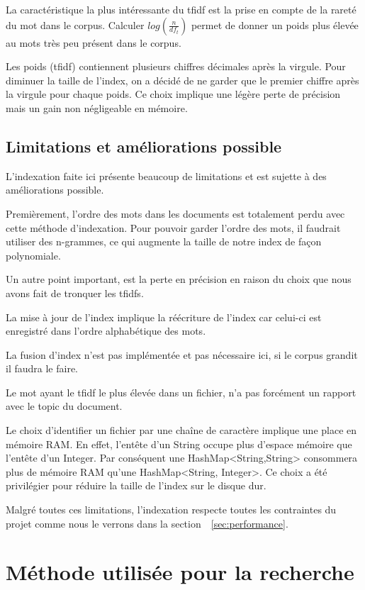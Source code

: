 La caractéristique la plus intéressante du tfidf est la prise en compte de la rareté du mot dans le corpus. Calculer $log(\frac{n}{df_t})$ permet de donner un poids plus élevée au mots très peu présent dans le corpus. 

Les poids (tfidf) contiennent plusieurs chiffres décimales après la virgule. Pour diminuer la taille de l'index, on a décidé de ne garder que le premier chiffre après la virgule pour chaque poids. Ce choix implique une légère perte de précision mais un gain non négligeable en mémoire.

\subsection{Limitations et améliorations possible}
L'indexation faite ici présente beaucoup de limitations et est sujette à des améliorations possible.

Premièrement, l'ordre des mots dans les documents est totalement perdu avec cette méthode d'indexation. Pour pouvoir  garder l'ordre des mots, il faudrait utiliser des n-grammes, ce qui augmente la taille de notre index de façon polynomiale. 

Un autre point important, est la perte en précision en raison du choix que nous avons fait de tronquer les tfidfs.

La mise à jour de l'index implique la réécriture de l'index car celui-ci est enregistré dans l'ordre alphabétique des mots.

La fusion d'index n'est pas implémentée et pas nécessaire ici, si le corpus grandit il faudra le faire.

Le mot ayant le tfidf le plus élevée dans un fichier, n'a pas forcément un rapport avec le topic du document.

Le choix d'identifier un fichier par une chaîne de caractère implique une place en mémoire RAM. En effet, l'entête d'un String occupe plus d'espace mémoire que l'entête d'un Integer. Par conséquent une HashMap<String,String> consommera plus de mémoire RAM qu'une HashMap<String, Integer>. Ce choix a été privilégier pour réduire la taille de l'index sur le disque dur.

Malgré toutes ces limitations, l'indexation respecte toutes les contraintes du projet comme nous le verrons dans la section~~\ref{sec:performance}.

\section{Méthode utilisée pour la recherche}

